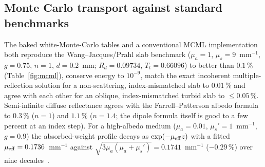 \documentclass[journal]{IEEEtran}
\newcommand{\mua}{\mu_a}
\newcommand{\mus}{\mu_s}
\newcommand{\musp}{\mu_s'}
\begin{document}
\subsection{Monte Carlo transport against standard benchmarks}
\label{sec:v_mc}
The baked white-Monte-Carlo tables and a conventional MCML implementation both reproduce the Wang--Jacques/Prahl slab benchmark ($\mua=1$, $\mus=9$~mm$^{-1}$, $g=0.75$, $n=1$, $d=0.2$~mm; $R_d=0.09734$, $T_t=0.66096$) to better than $0.1\,\%$ (Table~\ref{fig:mcml}), conserve energy to $10^{-9}$, match the exact incoherent multiple-reflection solution for a non-scattering, index-mismatched slab to $0.01\,\%$ and agree with each other for an oblique, index-mismatched turbid slab to $\le0.05\,\%$. Semi-infinite diffuse reflectance agrees with the Farrell--Patterson albedo formula~\cite{farrell1992} to $0.3\,\%$ ($n=1$) and $1.1\,\%$ ($n=1.4$; the dipole formula itself is good to a few percent at an index step). For a high-albedo medium ($\mua=0.01$, $\musp=1$~mm$^{-1}$, $g=0.9$) the absorbed-weight profile decays as $\exp(-\mu_{\rm eff}z)$ with a fitted $\mu_{\rm eff}=0.1736$~mm$^{-1}$ against $\sqrt{3\mua(\mua+\musp)}=0.1741$~mm$^{-1}$ ($-0.29\,\%$) over nine decades~\cite{patterson1989}.
\end{document}
